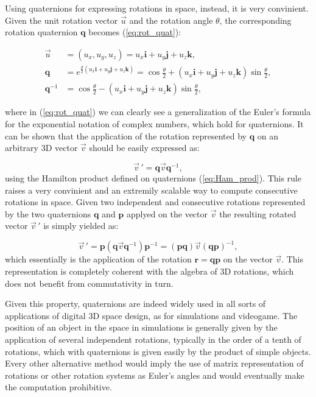     Using quaternions for expressing rotations in space, instead, it is very convinient. Given the unit rotation vector $\vec u$ and the rotation angle $\theta$, the corresponding rotation quaternion $\bm{q}$ becomes (\ref{eq:rot_quat}):

    \begin{align}
        \vec u & = (u_x, u_y, u_z) = u_x\bm{i} + u_y\bm{j} + u_z\bm{k}, \\
        \bm{q} & = e^{\frac{\theta}{2}(u_x\bm{i} + u_y\bm{j} + u_z\bm{k})} = \cos{\frac{\theta}{2}} + (u_x\bm{i} + u_y\bm{j} + u_z\bm{k})\sin{\frac{\theta}{2}}, \label{eq:rot_quat}\\
        \bm{q}^{-1} & = \cos{\frac{\theta}{2}} - (u_x\bm{i} + u_y\bm{j} + u_z\bm{k})\sin{\frac{\theta}{2}},
    \end{align}

    where in (\ref{eq:rot_quat}) we can clearly see a generalization of the Euler's formula for the exponential notation of complex numbers, which hold for quaternions. It can be shown that the application of the rotation represented by $\bm{q}$ on an arbitrary 3D vector $\vec v$ should be easily expressed as:

    \begin{equation}
        \vec v\,' = \bm{q} \vec v \bm{q}^{-1},
    \end{equation}
    using the Hamilton product defined on quaternions (\ref{eq:Ham_prod}). This rule raises a very convinient and an extremily scalable way to compute consecutive rotations in space. Given two independent and consecutive rotations represented by the two quaternions $\bm{q}$ and $\bm{p}$ applyed on the vector $\vec v$ the resulting rotated vector $\vec v\,'$ is simply yielded as:

    \begin{equation}
        \vec v\,' = \bm{p} ( \bm{q} \vec v \bm{q}^{-1} ) \bm{p}^{-1} = (\bm{p}\bm{q}) \vec v (\bm{q}\bm{p})^{-1},
    \end{equation}
    which essentially is the application of the rotation $\bm{r} = \bm{q}\bm{p}$ on the vector $\vec v$. This representation is completely coherent with the algebra of 3D rotations, which does not benefit from commutativity in turn.

    Given this property, quaternions are indeed widely used in all sorts of applications of digital 3D space design, as for simulations and videogame. The position of an object in the space in simulations is generally given by the application of several independent rotations, typically in the order of a tenth of rotations, which with quaternions is given easily by the product of simple objects. Every other alternative method would imply the use of matrix representation of rotations or other rotation systems as Euler's angles and would eventually make the computation prohibitive.

